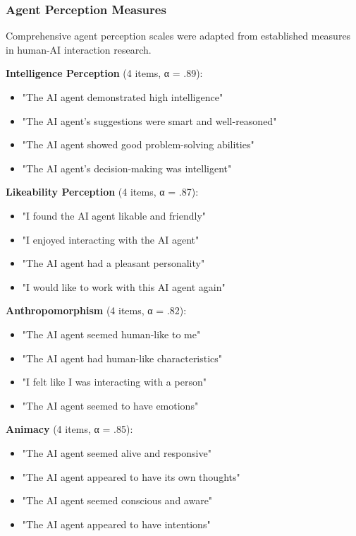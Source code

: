 \documentclass[12pt]{article}
\begin{document}
\subsubsection{Agent Perception Measures}

Comprehensive agent perception scales were adapted from established measures in human-AI interaction research.

\textbf{Intelligence Perception} (4 items, α = .89):
\begin{itemize}
    \item "The AI agent demonstrated high intelligence"
    \item "The AI agent's suggestions were smart and well-reasoned"
    \item "The AI agent showed good problem-solving abilities"
    \item "The AI agent's decision-making was intelligent"
\end{itemize}

\textbf{Likeability Perception} (4 items, α = .87):
\begin{itemize}
    \item "I found the AI agent likable and friendly"
    \item "I enjoyed interacting with the AI agent"
    \item "The AI agent had a pleasant personality"
    \item "I would like to work with this AI agent again"
\end{itemize}

\textbf{Anthropomorphism} (4 items, α = .82):
\begin{itemize}
    \item "The AI agent seemed human-like to me"
    \item "The AI agent had human-like characteristics"
    \item "I felt like I was interacting with a person"
    \item "The AI agent seemed to have emotions"
\end{itemize}

\textbf{Animacy} (4 items, α = .85):
\begin{itemize}
    \item "The AI agent seemed alive and responsive"
    \item "The AI agent appeared to have its own thoughts"
    \item "The AI agent seemed conscious and aware"
    \item "The AI agent appeared to have intentions"
\end{itemize}
\end{document}
